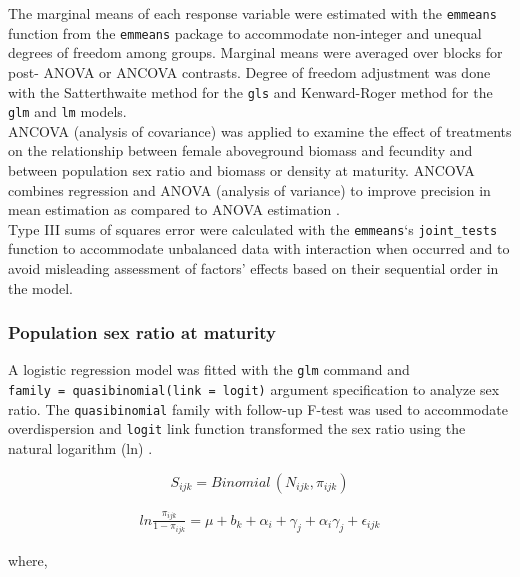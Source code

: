 \documentclass[
]{article}
\begin{document}
The marginal means of each response variable were estimated with the \texttt{emmeans} function from the \texttt{emmeans} package \citep[version 1.7.1-1][]{lenthEmmeansEstimatedMarginal2021} to accommodate non-integer and unequal degrees of freedom among groups. Marginal means were averaged over blocks for post- ANOVA or ANCOVA contrasts. Degree of freedom adjustment was done with the Satterthwaite method for the \texttt{gls} and Kenward-Roger method for the \texttt{glm} and \texttt{lm} models.\\
ANCOVA (analysis of covariance) was applied to examine the effect of treatments on the relationship between female aboveground biomass and fecundity and between population sex ratio and biomass or density at maturity.
ANCOVA combines regression and ANOVA (analysis of variance) to improve precision in mean estimation as compared to ANOVA estimation \citep{yangAnalysisCovarianceAgronomy2011}.\\
Type III sums of squares error were calculated with the \texttt{emmeans}`s \texttt{joint\_tests} function to accommodate unbalanced data with interaction when occurred and to avoid misleading assessment of factors' effects based on their sequential order in the model.

\hypertarget{population-sex-ratio-at-maturity}{%
\subsubsection*{Population sex ratio at maturity}\label{population-sex-ratio-at-maturity}}

A logistic regression model was fitted with the \texttt{glm} command and \texttt{family\ =\ quasibinomial(link\ =\ logit)} argument specification to analyze sex ratio. The \texttt{quasibinomial} family with follow-up F-test was used to accommodate overdispersion and \texttt{logit} link function transformed the sex ratio using the natural logarithm (ln) \citep{crawleyProportionData2013}.

\[ S_{ijk} = Binomial\,(N_{ijk},\pi_{ijk}) \]

\begin{align}
ln \frac{\pi_{ijk}}{1-\pi_{ijk}} = \mu + b_k + \alpha_i + \gamma_j +\alpha_i \gamma_j + \epsilon_{ijk} \label{eq:sex-mature}
\end{align}

where,
\end{document}
